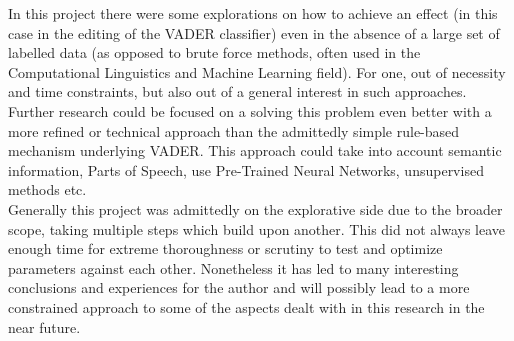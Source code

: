 \documentclass[11pt]{article}
\begin{document}
In this project there were some explorations on how to achieve an effect (in this case in the editing of the VADER classifier) even in the absence of a large set of labelled data (as opposed to brute force methods, often used in the Computational Linguistics and Machine Learning field). For one, out of necessity and time constraints, but also out of a general interest in such approaches. Further research could be focused on a solving this problem even better with a more refined or technical approach than the admittedly simple rule-based mechanism underlying VADER. This approach could take into account semantic information, Parts of Speech, use Pre-Trained Neural Networks, unsupervised methods etc. \\
Generally this project was admittedly on the explorative side due to the broader scope, taking multiple steps which build upon another. This did not always leave enough time for extreme thoroughness or scrutiny to test and optimize parameters against each other. Nonetheless it has led to many interesting conclusions and experiences for the author and will possibly lead to a more constrained approach to some of the aspects dealt with in this research in the near future. \\



\medskip

 


\end{document}
